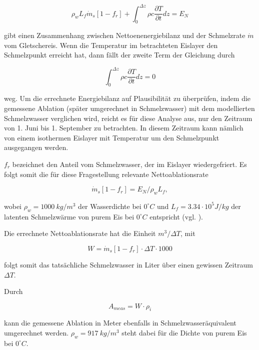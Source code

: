 \documentclass[12pt,a4paper]{article}
\begin{document}
\begin{equation}
\rho_{w} L_{f} \dot{m}_{s}\left[1-f_{r}\right]+\int_{0}^{\Delta z} \rho c \frac{\partial T}{\partial t} d z=E_{N}
\end{equation}


gibt einen Zusammenhang zwischen Nettoenenergiebilanz und der Schmelzrate $\dot{m}$ vom Gletschereis. Wenn die Temperatur im betrachteten Eislayer den Schmelzpunkt erreicht hat, dann fällt der zweite Term der Gleichung durch


\begin{equation}
\int_{0}^{\Delta z} \rho c \frac{\partial T}{\partial t} d z=0
\end{equation}

weg. Um die errechnete Energiebilanz auf Plausibilität zu überprüfen, indem die gemessene Ablation (später umgerechnet in Schmelzwasser) mit dem modellierten Schmelzwasser verglichen wird, reicht es für diese Analyse aus, nur den Zeitraum von 1. Juni bis 1. September zu betrachten. In diesem Zeitraum kann nämlich von einem isothermen Eislayer mit Temperatur um den Schmelzpunkt ausgegangen werden.

$f_r$ bezeichnet den Anteil vom Schmelzwasser, der im Eislayer wiedergefriert. Es folgt somit die für diese Fragestellung relevante Nettoablationsrate 

\begin{equation}
\dot{m}_{s}\left[1-f_{r}\right]=E_{N} / \rho_{w} L_{f},
\end{equation}

wobei $\rho_{w}=1000~kg/m^{3}$ der Wasserdichte bei $0^\circ C$ und $L_{f}=3.34 \cdot 10^5 J/kg$ der latenten Schmelzwärme von purem Eis bei $0^\circ C$ entspricht (vgl. \cite[142]{ThePhysicsOfGlaciers}).

Die errechnete Nettoablationsrate hat die Einheit $m^3/\Delta T$, mit

\begin{equation}
W = \dot{m}_{s}\left[1-f_{r}\right] \cdot \Delta T \cdot 1000
\end{equation}


folgt somit das tatsächliche Schmelzwasser in Liter über einen gewissen Zeitraum $\Delta T$.

Durch 

\begin{equation}
A_{meas} = W \cdot \rho_{i}
\end{equation}


kann die gemessene Ablation in Meter ebenfalls in Schmelzwasseräquivalent umgerechnet werden. $\rho_{w}=917~kg/m^3$ steht dabei für die Dichte von purem Eis bei $0^\circ C$.\\
\end{document}
